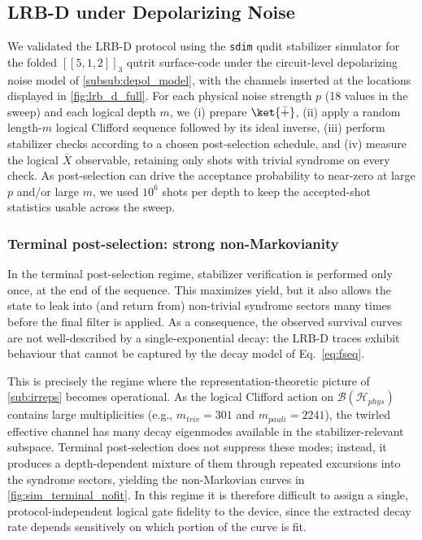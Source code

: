 \subsection{LRB-D under Depolarizing Noise}
\label{sub:simulation_results}

We validated the LRB-D protocol using the \texttt{sdim} qudit
stabilizer simulator \cite{sdim} for the folded $[[5,1,2]]_3$ qutrit
surface-code under the circuit-level
depolarizing noise model of \autoref{subsub:depol_model}, with the
channels inserted at the locations displayed in
\autoref{fig:lrb_d_full}. For each physical noise
strength $p$ (18 values in the sweep) and each logical depth $m$, we
(i) prepare $\ket{\bar{+}}$, (ii) apply a random length-$m$ logical
Clifford sequence followed by its ideal inverse, (iii) perform
stabilizer checks according to a chosen post-selection schedule, and
(iv) measure the logical $\bar{X}$ observable, retaining only shots
with trivial syndrome on every check. As post-selection can
drive the acceptance probability to near-zero at large $p$ and/or
large $m$, we used $10^6$ shots per depth to keep the accepted-shot
statistics usable across the sweep.

\subsubsection{Terminal post-selection: strong non-Markovianity}
In the terminal post-selection regime, stabilizer
verification is performed only once, at the end of the sequence. This
maximizes yield, but it also allows the state to leak into (and
return from) non-trivial syndrome sectors many times before the final
filter is applied. As a consequence, the observed survival curves are
not well-described by a single-exponential decay: the LRB-D traces
exhibit behaviour that cannot be captured by the decay model of
Eq.~\eqref{eq:fseq}.


This is precisely the regime where the representation-theoretic
picture of \autoref{sub:irreps} becomes operational. As the
logical Clifford action on $\mathcal{B}(\mathcal{H}_{phys})$ contains
large multiplicities (e.g., $m_{triv}=301$ and $m_{pauli}=2241$), the
twirled effective channel has many decay eigenmodes available in the
stabilizer-relevant subspace. Terminal post-selection does not
suppress these modes; instead, it produces a depth-dependent mixture
of them through repeated excursions into the syndrome sectors,
yielding the non-Markovian curves in \autoref{fig:sim_terminal_nofit}.
In this regime it is therefore difficult to assign a single,
protocol-independent logical gate fidelity to the device, since
the extracted decay rate depends sensitively on which portion of the
curve is fit.

